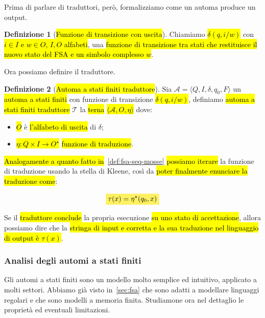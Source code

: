 \documentclass[a4paper,11pt,oneside]{article}
\theoremstyle{plain}
\theoremstyle{definition}
\newtheorem{defn}{Definizione}[section]
\theoremstyle{remark}
\newcommand{\mhl}[1]{\colorbox{hlcolor}{$\displaystyle #1$}}
\begin{document}
Prima di parlare di traduttori, però, formalizziamo come un automa produce un
output.

\begin{defn}[\hl{Funzione di transizione con uscita}]\label{def:fsa-transizione-uscita}
  Chiamiamo \hl{$\delta(q, i/w)$} con \hl{$i \in I$ e $w \in O$, $I, O$
  alfabeti}, una \hl{funzione di transizione tra stati che restituisce il nuovo
  stato del FSA e un simbolo complesso $w$}.
\end{defn}

Ora possiamo definire il traduttore.

\begin{defn}[\hl{Automa a stati finiti traduttore}]\label{def:fsa-trad}
  Sia $\mathcal{A} = \langle Q, I, \delta, q_0, F \rangle $ un \hl{automa a
  stati finiti} con funzione di transizione \hl{$\delta(q, i/w)$}, definiamo
  \hl{automa a stati finiti traduttore} $\mathcal{T}$ la \hl{terna} \hl{$\langle
  \mathcal{A}, O, \eta \rangle$} dove:

  \begin{itemize}
    \item \hl{$O$} è \hl{l'alfabeto di uscita} di $\delta$;
    \item \hl{$\eta : Q \times I \to O^\star$} \hl{funzione di traduzione}.
  \end{itemize}
\end{defn}

\hl{Analogamente a quanto fatto in}~\ref{def:fsa-seq-mosse} \hl{possiamo
iterare} la funzione di traduzione usando la stella di Kleene, così da \hl{poter
finalmente enunciare la traduzione come}:

\begin{equation}
  \mhl{\tau(x) = \eta^\star(q_0, x)}
\end{equation}

Se il \hl{traduttore conclude} la propria esecuzione \hl{su uno stato di
accettazione}, allora possiamo dire che la \hl{stringa di input e corretta e la
sua traduzione nel linguaggio di output è $\tau(x)$}.

\subsubsection{Analisi degli automi a stati finiti}\label{sec:fsa-analisi}

Gli automi a stati finiti sono un modello molto semplice ed intuitivo, applicato
a molti settori. Abbiamo già visto in~\ref{sec:fsa} che sono adatti a modellare
linguaggi regolari e che sono modelli a memoria finita. Studiamone ora nel
dettaglio le proprietà ed eventuali limitazioni.
\end{document}
